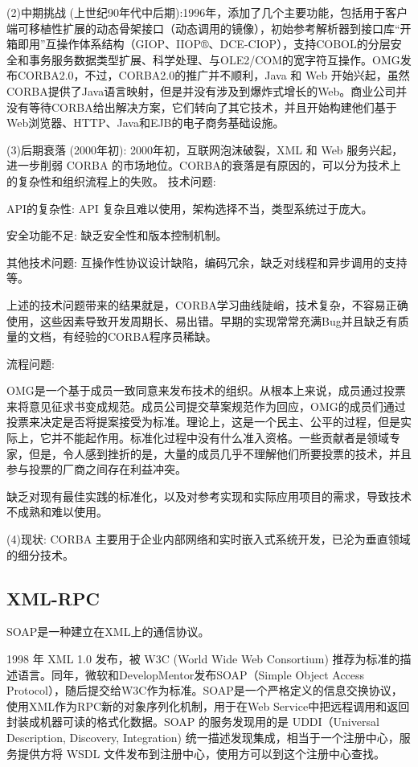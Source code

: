 \documentclass[a4paper,twoside]{scrbook}
\begin{document}
\begin{CJK}{UTF8}{gbsn}
(2)中期挑战 (上世纪90年代中后期):1996年，添加了几个主要功能，包括用于客户端可移植性扩展的动态骨架接口（动态调用的镜像），初始参考解析器到接口库“开箱即用”互操作体系结构（GIOP、IIOP®、DCE-CIOP），支持COBOL的分层安全和事务服务数据类型扩展、科学处理、与OLE2/COM的宽字符互操作。OMG发布CORBA2.0，不过，CORBA2.0的推广并不顺利，Java 和 Web 开始兴起，虽然CORBA提供了Java语言映射，但是并没有涉及到爆炸式增长的Web。商业公司并没有等待CORBA给出解决方案，它们转向了其它技术，并且开始构建他们基于Web浏览器、HTTP、Java和EJB的电子商务基础设施。

(3)后期衰落 (2000年初): 2000年初，互联网泡沫破裂，XML 和 Web 服务兴起，进一步削弱 CORBA 的市场地位。CORBA的衰落是有原因的，可以分为技术上的复杂性和组织流程上的失败。
技术问题:

API的复杂性: API 复杂且难以使用，架构选择不当，类型系统过于庞大。

安全功能不足: 缺乏安全性和版本控制机制。

其他技术问题: 互操作性协议设计缺陷，编码冗余，缺乏对线程和异步调用的支持等。

上述的技术问题带来的结果就是，CORBA学习曲线陡峭，技术复杂，不容易正确使用，这些因素导致开发周期长、易出错。早期的实现常常充满Bug并且缺乏有质量的文档，有经验的CORBA程序员稀缺。

流程问题:

OMG是一个基于成员一致同意来发布技术的组织。从根本上来说，成员通过投票来将意见征求书变成规范。成员公司提交草案规范作为回应，OMG的成员们通过投票来决定是否将提案接受为标准。理论上，这是一个民主、公平的过程，但是实际上，它并不能起作用。标准化过程中没有什么准入资格。一些贡献者是领域专家，但是，令人感到挫折的是，大量的成员几乎不理解他们所要投票的技术，并且参与投票的厂商之间存在利益冲突。

缺乏对现有最佳实践的标准化，以及对参考实现和实际应用项目的需求，导致技术不成熟和难以使用。

(4)现状: CORBA 主要用于企业内部网络和实时嵌入式系统开发，已沦为垂直领域的细分技术。

\subsection{XML-RPC}
SOAP是一种建立在XML上的通信协议。

1998 年 XML 1.0 发布，被 W3C (World Wide Web Consortium) 推荐为标准的描述语言。同年，微软和DevelopMentor发布SOAP（Simple Object Access Protocol），随后提交给W3C作为标准。SOAP是一个严格定义的信息交换协议，使用XML作为RPC新的对象序列化机制，用于在Web Service中把远程调用和返回封装成机器可读的格式化数据。SOAP 的服务发现用的是 UDDI（Universal Description, Discovery, Integration) 统一描述发现集成，相当于一个注册中心，服务提供方将 WSDL 文件发布到注册中心，使用方可以到这个注册中心查找。


\end{CJK}
\end{document}
